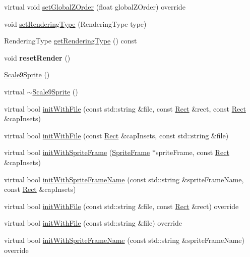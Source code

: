 \begin{DoxyCompactItemize}
\item 
virtual void \hyperlink{classui_1_1Scale9Sprite_a7347765b62bbd3f21677e25e1ca164a3}{set\+Global\+Z\+Order} (float global\+Z\+Order) override
\item 
void \hyperlink{classui_1_1Scale9Sprite_a8c2f5c69134b3e363e62acf6ef28ea8b}{set\+Rendering\+Type} (Rendering\+Type type)
\item 
Rendering\+Type \hyperlink{classui_1_1Scale9Sprite_a460bd16954e1a62f14bd0bf7aab490c8}{get\+Rendering\+Type} () const
\item 
\mbox{\label{classui_1_1Scale9Sprite_a2b1323850c37dd18ee63b3599e219dce}} 
void {\bfseries reset\+Render} ()
\item 
\hyperlink{classui_1_1Scale9Sprite_a83eb1e0b7350afbc668cfd0fc9605f6b}{Scale9\+Sprite} ()
\item 
virtual \hyperlink{classui_1_1Scale9Sprite_a21dc74db2de0d0b8f1a19a3eaa31cef4}{$\sim$\+Scale9\+Sprite} ()
\item 
virtual bool \hyperlink{classui_1_1Scale9Sprite_ac817b7ddf557e3aff8fd89db18a60c30}{init\+With\+File} (const std\+::string \&file, const \hyperlink{classRect}{Rect} \&rect, const \hyperlink{classRect}{Rect} \&cap\+Insets)
\item 
virtual bool \hyperlink{classui_1_1Scale9Sprite_aff4ec248f0baa654e23b4107147e770b}{init\+With\+File} (const \hyperlink{classRect}{Rect} \&cap\+Insets, const std\+::string \&file)
\item 
virtual bool \hyperlink{classui_1_1Scale9Sprite_a91d24fd8e04f2db89c58c3e1e6c17e14}{init\+With\+Sprite\+Frame} (\hyperlink{classSpriteFrame}{Sprite\+Frame} $\ast$sprite\+Frame, const \hyperlink{classRect}{Rect} \&cap\+Insets)
\item 
virtual bool \hyperlink{classui_1_1Scale9Sprite_a1d4ad0d1b13fa77c9caa40c9902a3269}{init\+With\+Sprite\+Frame\+Name} (const std\+::string \&sprite\+Frame\+Name, const \hyperlink{classRect}{Rect} \&cap\+Insets)
\item 
virtual bool \hyperlink{classui_1_1Scale9Sprite_a8ec4db44e4fdf3b0a4cdfef646dbdd6a}{init\+With\+File} (const std\+::string \&file, const \hyperlink{classRect}{Rect} \&rect) override
\item 
virtual bool \hyperlink{classui_1_1Scale9Sprite_a2c5a440147b13f433454d65a20a31398}{init\+With\+File} (const std\+::string \&file) override
\item 
virtual bool \hyperlink{classui_1_1Scale9Sprite_ad7b24ae46593942f22091bbc76df9e41}{init\+With\+Sprite\+Frame\+Name} (const std\+::string \&sprite\+Frame\+Name) override

\end{DoxyCompactItemize}
